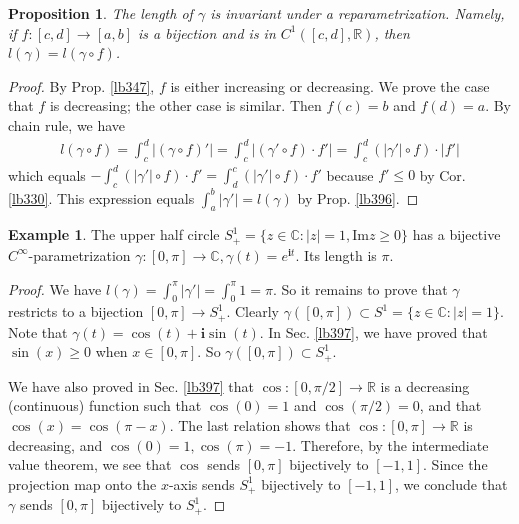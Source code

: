 \documentclass[12pt,b5paper,notitlepage]{article}
\theoremstyle{definition}
\newtheorem{eg}[df]{Example}
\theoremstyle{plain}
\newtheorem{pp}[df]{Proposition}
\newcommand{\im}{\mathbf{i}}
\newcommand{\Cbb}{\mathbb C}
\newcommand{\Rbb}{\mathbb R}
\newcommand{\Imag}{\mathrm{Im}}
\numberwithin{equation}{section}
\begin{document}
\begin{pp}\label{lb477}
The length of $\gamma$ is invariant under a reparametrization. Namely, if $f:[c,d]\rightarrow[a,b]$ is a bijection and is in $C^1([c,d],\Rbb)$, then $l(\gamma)=l(\gamma\circ f)$.
\end{pp}

\begin{proof}
By Prop. \ref{lb347}, $f$ is either increasing or decreasing. We prove the case that $f$ is decreasing; the other case is similar. Then $f(c)=b$ and $f(d)=a$. By chain rule, we have
\begin{align*}
l(\gamma\circ f)=\int_c^d |(\gamma\circ f)'|=\int_c^d |(\gamma'\circ f)\cdot f'|=\int_c^d (|\gamma'|\circ f)\cdot |f'|
\end{align*}
which equals $-\int_c^d (|\gamma'|\circ f)\cdot f'=\int_d^c(|\gamma'|\circ f)\cdot f'$ because $f'\leq 0$ by Cor. \ref{lb330}. This expression equals $\int_a^b |\gamma'|=l(\gamma)$ by Prop. \ref{lb396}.
\end{proof}


\begin{eg}\label{lb398}
The upper half circle $S^1_+=\{z\in\Cbb:|z|=1,\Imag z\geq 0\}$ has a bijective $C^\infty$-parametrization $\gamma:[0,\pi]\rightarrow\Cbb,\gamma(t)=e^{\im t}$. Its length is $\pi$.
\end{eg}


\begin{proof}
We have $l(\gamma)=\int_0^\pi |\gamma'|=\int_0^\pi 1=\pi$. So it remains to prove that $\gamma$ restricts to a bijection $[0,\pi]\rightarrow S^1_+$. Clearly $\gamma([0,\pi])\subset S^1=\{z\in\Cbb:|z|=1\}$. Note that $\gamma(t)=\cos(t)+\im\sin(t)$. In Sec. \ref{lb397}, we have proved that $\sin(x)\geq0$ when $x\in[0,\pi]$. So $\gamma([0,\pi])\subset S^1_+$. 

We have also proved in Sec. \ref{lb397} that $\cos:[0,\pi/2]\rightarrow\Rbb$ is a decreasing (continuous) function such that $\cos(0)=1$ and $\cos(\pi/2)=0$, and that $\cos(x)=\cos(\pi-x)$. The last relation shows that $\cos:[0,\pi]\rightarrow\Rbb$ is decreasing, and $\cos(0)=1,\cos(\pi)=-1$. Therefore, by the intermediate value theorem, we see that $\cos$ sends $[0,\pi]$ bijectively to $[-1,1]$. Since the projection map onto the $x$-axis sends $S^1_+$ bijectively to $[-1,1]$, we conclude that $\gamma$ sends $[0,\pi]$ bijectively to $S^1_+$.
\end{proof}
\end{document}
